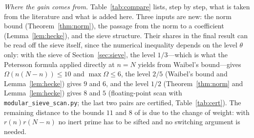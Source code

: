 \documentclass[11pt]{amsart}
\theoremstyle{remark}
\begin{document}
\begin{enumerate}[label=(\alph*),leftmargin=2em]
\end{enumerate}

\emph{Where the gain comes from.} Table~\ref{tab:compare} lists, step by step, what is taken from the literature and what is added here. Three inputs are new: the norm bound (Theorem~\ref{thm:norm}), the passage from the norm to a coefficient (Lemma~\ref{lem:hecke}), and the sieve structure. Their shares in the final result can be read off the sieve itself, since the numerical inequality depends on the level $\theta$ only: with the sieve of Section~\ref{sec:sieve}, the level $1/3$---which is what the Petersson formula applied directly at $n=N$ yields from Waibel's bound---gives $\Omega(n(N-n))\le 10$ and $\max\Omega\le6$, the level $2/5$ (Waibel's bound and Lemma~\ref{lem:hecke}) gives $9$ and $6$, and the level $1/2$ (Theorem~\ref{thm:norm} and Lemma~\ref{lem:hecke}) gives $8$ and $5$ (floating-point scan with \texttt{modular\_sieve\_scan.py}; the last two pairs are certified, Table~\ref{tab:cert}). The remaining distance to the bounds $11$ and $8$ of \cite{Chen2} is due to the change of weight: with $r(n)r(N-n)$ no inert prime has to be sifted and no switching argument is needed.
\end{document}
